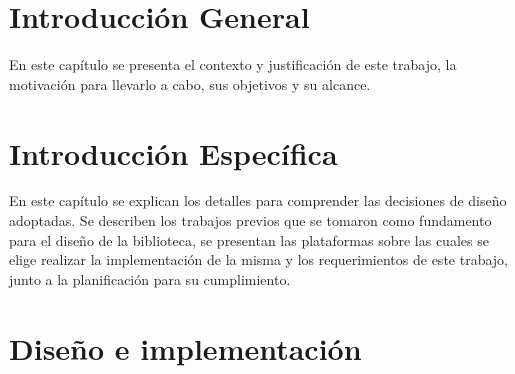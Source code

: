 \documentclass[
11pt, %
spanish,
singlespacing, %
parskip, %
headsepline, %
]{MastersDoctoralThesis} %
\begin{document}
\newcommand{\titulo}[1]{\bigskip \noindent\textbf{#1} \\} %
\newcommand{\subtitulo}[1]{\bigskip \noindent\textit{#1} \\} %



\chapter{Introducción General}
\label{ChapterIntroGral}

En este capítulo se presenta el contexto y justificación de este trabajo, la motivación para llevarlo a cabo, sus objetivos y su alcance.





\chapter{Introducción Específica}
\label{ChapterIntroEsp}

En este capítulo se explican los detalles para comprender las decisiones de diseño adoptadas. Se describen los trabajos previos que se tomaron como fundamento para el diseño de la biblioteca, se presentan las plataformas sobre las cuales se elige realizar la implementación de la misma y los requerimientos de este trabajo, junto a la planificación para su cumplimiento.


 
 
 
 

\chapter{Diseño e implementación}
\label{ChapterDiseno}
\end{document}

